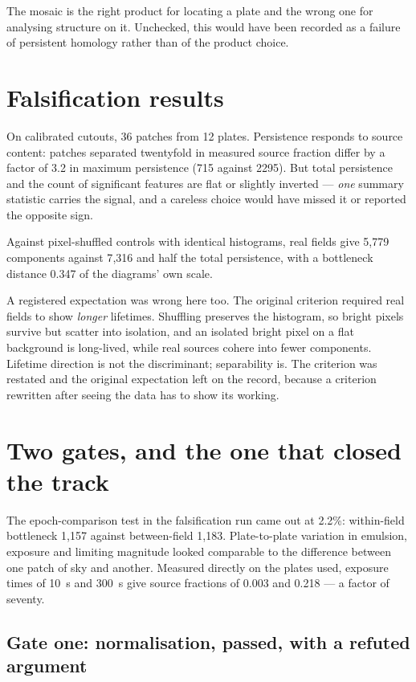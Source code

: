 \documentclass[11pt,a4paper]{report}
\begin{document}
The mosaic is the right product for locating a plate and the wrong one for analysing
structure on it. Unchecked, this would have been recorded as a failure of persistent
homology rather than of the product choice.

\section{Falsification results}

On calibrated cutouts, 36 patches from 12 plates. Persistence responds to source content:
patches separated twentyfold in measured source fraction differ by a factor of 3.2 in maximum
persistence (715 against 2295). But total persistence and the count of significant features
are flat or slightly inverted --- \emph{one} summary statistic carries the signal, and a
careless choice would have missed it or reported the opposite sign.

Against pixel-shuffled controls with identical histograms, real fields give 5{,}779
components against 7{,}316 and half the total persistence, with a bottleneck distance 0.347 of
the diagrams' own scale.

A registered expectation was wrong here too. The original criterion required real fields to
show \emph{longer} lifetimes. Shuffling preserves the histogram, so bright pixels survive but
scatter into isolation, and an isolated bright pixel on a flat background is long-lived, while
real sources cohere into fewer components. Lifetime direction is not the discriminant;
separability is. The criterion was restated and the original expectation left on the record,
because a criterion rewritten after seeing the data has to show its working.

\section{Two gates, and the one that closed the track}

The epoch-comparison test in the falsification run came out at 2.2\%: within-field bottleneck
1{,}157 against between-field 1{,}183. Plate-to-plate variation in emulsion, exposure and
limiting magnitude looked comparable to the difference between one patch of sky and another.
Measured directly on the plates used, exposure times of 10~s and 300~s give source fractions
of 0.003 and 0.218 --- a factor of seventy.

\subsection{Gate one: normalisation, passed, with a refuted argument}
\end{document}
